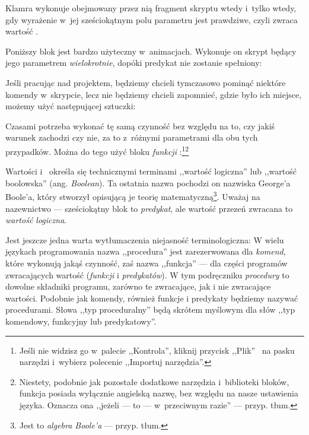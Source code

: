\documentclass[a4paper]{report}
\begin{document}

Klamra  wykonuje obejmowany przez nią fragment skryptu wtedy i~tylko wtedy, gdy wyrażenie w~jej sześciokątnym polu parametru jest prawdziwe, czyli zwraca wartość .\nopagebreak


Poniższy blok jest bardzo użyteczny w~animacjach. Wykonuje on skrypt będący jego parametrem \emph{wielokrotnie}, dopóki predykat nie zostanie spełniony:\nopagebreak


Jeśli pracując nad projektem, będziemy chcieli tymczasowo pominąć niektóre komendy w~skrypcie, lecz nie będziemy chcieli zapomnieć, gdzie było ich miejsce, możemy użyć następującej sztuczki:\nopagebreak


Czasami potrzeba wykonać tę samą czynność bez względu na to, czy jakiś warunek zachodzi czy nie, za to z~różnymi parametrami dla obu tych przypadków. Można do tego użyć bloku \emph{funkcji} :\footnote{\onehalfspacing Jeśli nie widzisz go w~palecie ,,Kontrola'', kliknij przycisk ,,Plik''~ na pasku narzędzi i~wybierz polecenie ,,Importuj narzędzia''.}\footnote{Niestety, podobnie jak pozostałe dodatkowe narzędzia i~biblioteki bloków, funkcja  posiada wyłącznie angielską nazwę, bez względu na nasze ustawienia języka. Oznacza ona ,,jeżeli --- to --- w~przeciwnym razie'' --- przyp. tłum.}\nopagebreak


Wartości  i~ określa się technicznymi terminami ,,wartość logiczna'' lub ,,wartość boolowska'' (ang. \textit{Boolean}). Ta ostatnia nazwa pochodzi on nazwiska George'a Boole'a, który stworzył opisującą je teorię matematyczną\footnote{Jest to \emph{algebra Boole'a} --- przyp. tłum.}. Uważaj na nazewnictwo --- sześciokątny blok to \emph{predykat}, ale wartość przezeń zwracana to \emph{wartość logiczna}.

Jest jeszcze jedna warta wytłumaczenia niejasność terminologiczna:  W wielu językach programowania nazwa ,,procedura'' jest zarezerwowana dla \emph{komend}, które wykonują jakąś czynność, zaś nazwa ,,funkcja'' --- dla części programów zwracających wartość (\emph{funkcji} i \emph{predykatów}). W tym podręczniku \emph{procedury} to dowolne składniki programu, zarówno te zwracające, jak i nie zwracające wartości. Podobnie jak komendy, również funkcje i predykaty będziemy nazywać procedurami. Słowa ,,typ proceduralny'' będą skrótem myślowym dla słów ,,typ komendowy, funkcyjny lub predykatowy''.
\end{document}
